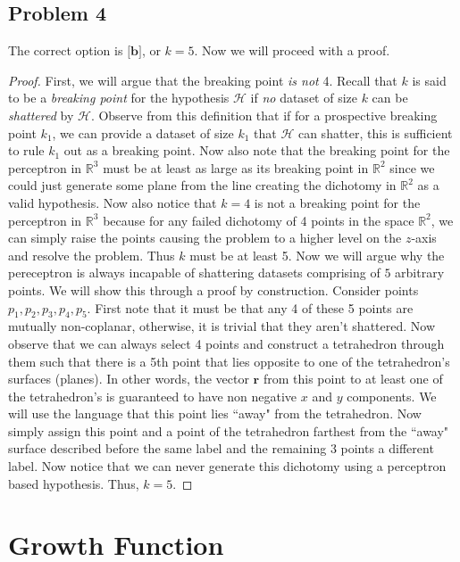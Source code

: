 \documentclass{article}
\begin{document}
\subsection*{Problem 4}
The correct option is $\textbf{[b]}$, or $k = 5$. Now we will proceed with a proof. 
\begin{proof}
    First, we will argue that the breaking point \emph{is not} 4. Recall that $k$ is said to be a \emph{breaking point} for the hypothesis $\mathcal{H}$ if \emph{no} dataset of size $k$ can be \emph{shattered} by $\mathcal{H}$. Observe from this definition that if for a prospective breaking point $k_{1}$, we can provide a dataset of size $k_{1}$ that $\mathcal{H}$ can shatter, this is sufficient to rule $k_{1}$ out as a breaking point. Now also note that the breaking point for the perceptron in $\mathbb{R}^{3}$ must be at least as large as its breaking point in $\mathbb{R}^{2}$ since we could just generate some plane from the line creating the dichotomy in $\mathbb{R}^{2}$ as a valid hypothesis. Now also notice that $k = 4$ is not a breaking point for the perceptron in $\mathbb{R}^{3}$ because for any failed dichotomy of 4 points in the space $\mathbb{R}^{2}$, we can simply raise the points causing the problem to a higher level on the $z$-axis and resolve the problem. Thus $k$ must be at least 5. Now we will argue why the pereceptron is always incapable of shattering datasets comprising of $5$ arbitrary points. We will show this through a proof by construction. Consider points $p_{1}, p_{2}, p_{3}, p_{4}, p_{5}$. First note that it must be that any 4 of these 5 points are mutually non-coplanar, otherwise, it is trivial that they aren't shattered. Now observe that we can always select 4 points and construct a tetrahedron through them such that there is a 5th point that lies opposite to one of the tetrahedron's surfaces (planes). In other words, the vector $\mathbf{r}$ from this point to at least one of the tetrahedron's is guaranteed to have non negative $x$ and $y$ components. We will use the language that this point lies ``away" from the tetrahedron. Now simply assign this point and a point of the tetrahedron farthest from the ``away" surface described before the same label and the remaining 3 points a different label. Now notice that we can never generate this dichotomy using a perceptron based hypothesis. Thus, $k = 5$. 
\end{proof}
\section*{Growth Function}
\end{document}
